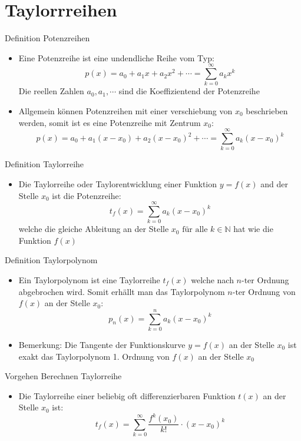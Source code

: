 \section{Taylorrreihen}
\begin{definition}{Definition Potenzreihen}\\
  \begin{itemize}
    \item Eine Potenzreihe ist eine undendliche Reihe vom Typ:
  \[p(x)=a_0+a_1x+a_2x^2+ \cdots = \sum_{k=0}^{\infty}{a_kx^k} \]
Die reellen Zahlen \(a_0,a_1, \cdots\) sind die Koeffizientend der Potenzreihe
  \item Allgemein können Potenzreihen mit einer verschiebung von \(x_0\) beschrieben werden, somit ist es eine
    Potenzreihe mit Zentrum \(x_0\):
    \[p(x)=a_0+a_1(x-x_0)+a_2(x-x_0)^2+\cdots = \sum_{k=0}^{\infty}{a_k(x-x_0)^k}\]
\end{itemize}
\end{definition}
\begin{definition}{Definition Taylorreihe}\\
  \begin{itemize}
    \item Die Taylorreihe oder Taylorentwicklung einer Funktion \(y=f(x)\) and der Stelle \(x_0\) ist die Potenzreihe:
      \[t_f(x)=\sum_{k=0}^{\infty}{a_k(x-x_0)^k}\]
      welche die gleiche Ableitung an der Stelle \(x_0 \text{ für alle }k\in \mathbb{N}\) hat wie die Funktion \(f(x)\)
  \end{itemize}
\end{definition}
\begin{definition}{Definition Taylorpolynom}\\
    \begin{itemize}
      \item Ein Taylorpolynom ist eine Taylorreihe \(t_f(x)\) welche nach \(n\text{-ter}\) Ordnung abgebrochen wird.
        Somit erhällt man das Taylorpolynom \(n\text{-ter}\) Ordnung von \(f(x)\) an der Stelle \(x_0\):
        \[p_n(x)=\sum_{k=0}^n{a_k(x-x_0)^k}\]
      \item Bemerkung: Die Tangente der Funktionskurve \(y=f(x) \) an der Stelle \(x_0\) ist exakt das Taylorpolynom 1.
        Ordnung von \(f(x)\) an der Stelle \(x_0\)
    \end{itemize}
\end{definition}
\begin{KR}{Vorgehen Berechnen Taylorreihe}
  \begin{itemize}
    \item Die Taylorreihe einer beliebig oft differenzierbaren Funktion \(t(x)\) an der Stelle \(x_0\) ist:
      \[t_f(x) = \sum_{k=0}^{\infty}{\frac{f^{k}(x_0)}{k!}\cdot(x-x_0)^k}\]
  \end{itemize}
\end{KR}
